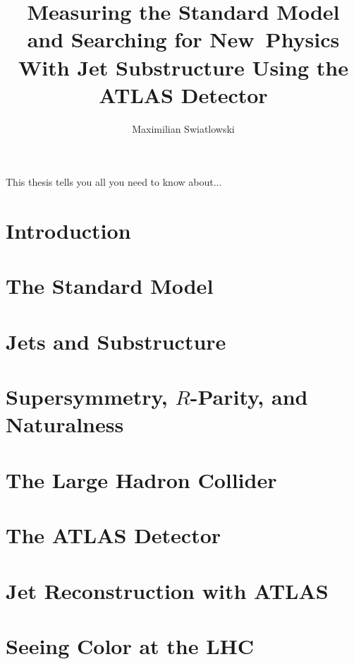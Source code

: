 \documentclass{report}
\begin{document}
\title{Measuring the Standard Model and Searching for New~Physics 
        With Jet Substructure Using the ATLAS Detector}
\author{Maximilian Swiatlowski}

 
\beforepreface
{}
    This thesis tells you all you need to know about...

\afterpreface
 
\chapter{Introduction}


\chapter{The Standard Model}



\chapter{Jets and Substructure}


\chapter{Supersymmetry, $R$-Parity, and Naturalness}



\chapter{The Large Hadron Collider}

		

\chapter{The ATLAS Detector}



\chapter{Jet Reconstruction with ATLAS}


\chapter{Seeing Color at the LHC}

\end{document}
